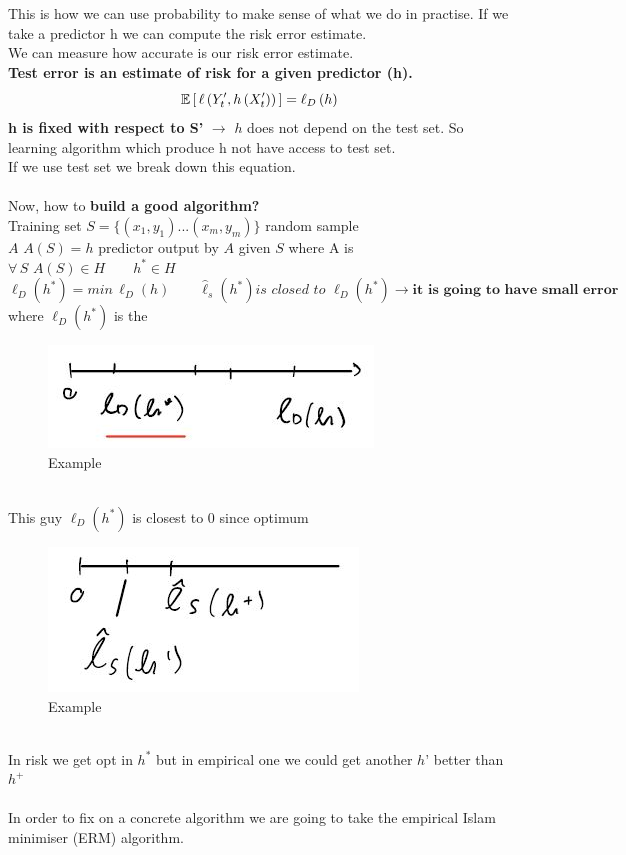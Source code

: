 \documentclass[../main.tex]{subfiles}
\begin{document}
This is how we can use probability to make sense of what we do in practise.
If we take a predictor h we can compute the risk error estimate.\\
We can measure how accurate is our risk error estimate.\\
\textbf{Test error is an estimate of risk for a given predictor (h).}
\\ 
$$
\mathbb{E} \left[ \, \ell\left( Y'_t, h\left(X'_t\right)\right) \, \right] = \ell_D \left( h\right) 
$$
\textbf{h is fixed with respect to S’} $\longrightarrow$ $h$ does not depend on the test set.
So learning algorithm which produce h not have access to test set.\\
If we use test set we break down this equation.
\\\\
Now, how to \textbf{build a good algorithm?}\\
Training set $S = \{ \left(x_1,y_1\right)...\left(x_m,y_m\right) \}$ random sample
\\$ A $ \qquad $A\left(S\right) = h $ predictor output by $A$ given $S$
where A is 
\\
$\forall \, S$ \qquad $A\left(S\right) \in H \qquad h^* \in H $
\\
$$
\ell_D\left(h^*\right) = min \, \ell_D \left(h\right) \qquad \hat{\ell}_s\left(h^*\right) \textit{is closed to } \ell_D\left(h^*\right) \longrightarrow \textbf{it is going to have small error }
$$
where $\ell_D\left(h^*\right)$ is the 
\begin{figure}[h]
    \centering
    \includegraphics[width=0.3\linewidth]{../img/lez7-img4.JPG}
    \caption{Example}
\end{figure}\\
This guy $\ell_D\left(h^*\right)$ is closest to $0$ since optimum\\
\begin{figure}[h]
    \centering
    \includegraphics[width=0.3\linewidth]{../img/lez7-img5.JPG}
    \caption{Example}
\end{figure}\\
In risk we get opt in $h^*$ but in empirical one we could get another $h’$ better than $h^+$
\\\\
In order to fix on a concrete algorithm we are going to take the empirical Islam
minimiser (ERM) algorithm.
\end{document}
